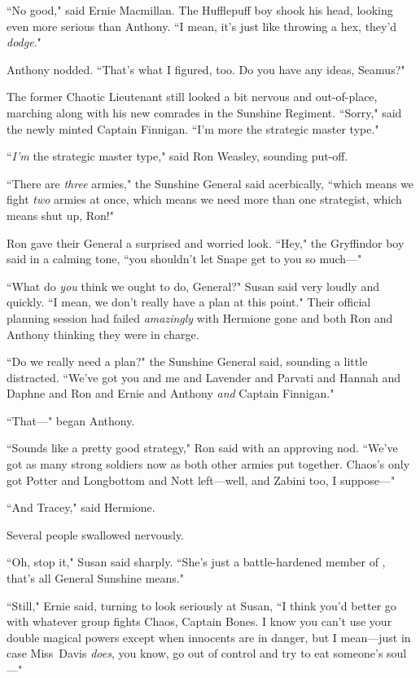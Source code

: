 ``No good," said Ernie Macmillan. The Hufflepuff boy shook his head, looking even more serious than Anthony. ``I mean, it's just like throwing a hex, they'd \emph{dodge}."

Anthony nodded. ``That's what I figured, too. Do you have any ideas, Seamus?"

The former Chaotic Lieutenant still looked a bit nervous and out-of-place, marching along with his new comrades in the Sunshine Regiment. ``Sorry," said the newly minted Captain Finnigan. ``I'm more the strategic master type."

``\emph{I'm} the strategic master type," said Ron Weasley, sounding put-off.

``There are \emph{three} armies," the Sunshine General said acerbically, ``which means we fight \emph{two} armies at once, which means we need more than one strategist, which means shut up, Ron!"

Ron gave their General a surprised and worried look. ``Hey," the Gryffindor boy said in a calming tone, ``you shouldn't let Snape get to you so much—"

``What do \emph{you} think we ought to do, General?" Susan said very loudly and quickly. ``I mean, we don't really have a plan at this point." Their official planning session had failed \emph{amazingly} with Hermione gone and both Ron and Anthony thinking they were in charge.

``Do we really need a plan?" the Sunshine General said, sounding a little distracted. ``We've got you and me and Lavender and Parvati and Hannah and Daphne and Ron and Ernie and Anthony \emph{and} Captain Finnigan."

``That—" began Anthony.

``Sounds like a pretty good strategy," Ron said with an approving nod. ``We've got as many strong soldiers now as both other armies put together. Chaos's only got Potter and Longbottom and Nott left—well, and Zabini too, I suppose—"

``And Tracey," said Hermione.

Several people swallowed nervously.

``Oh, stop it," Susan said sharply. ``She's just a battle-hardened member of \SPHEW, that's all General Sunshine means."

``Still," Ernie said, turning to look seriously at Susan, ``I think you'd better go with whatever group fights Chaos, Captain Bones. I know you can't use your double magical powers except when innocents are in danger, but I mean—just in case Miss~Davis \emph{does}, you know, go out of control and try to eat someone's soul—"

